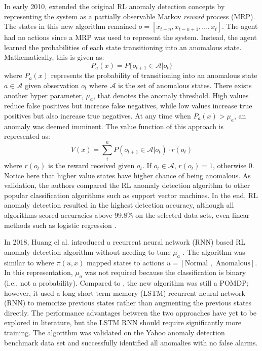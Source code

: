 In early 2010, \cite{seq_anomaly2} extended the original RL anomaly detection concepts by representing the system as a partially observable Markov \textit{reward} process (MRP). The states in this new algorithm remained $o = [x_{t-n}, x_{t-n+1}, ..., x_{t}]$. The agent had no actions since a MRP was used to represent the system. Instead, the agent learned the probabilities of each state transitioning into an anomalous state. Mathematically, this is given as:
\begin{equation}
    P_a(x) = P\{o_{t+1} \in \mathcal{A} | o_t\}
\end{equation}
where $P_a(x)$ represents the probability of transitioning into an anomalous state $a \in \mathcal{A}$ given observation $o_t$ where $\mathcal{A}$ is the set of anomalous states. There exists another hyper parameter, $\mu_a$, that denotes the anomaly threshold. High values reduce false positives but increase false negatives, while low values increase true positives but also increase true negatives. At any time when $P_a(x) > \mu_a$, an anomaly was deemed imminent. The value function of this approach is represented as:
\begin{equation}
    V(x) = \sum\limits_i^n P(o_{t+1} \in \mathcal{A} | o_t) \cdot r(o_t)
\end{equation}
where $r(o_t)$ is the reward received given $o_t$. If $o_t \in \mathcal{A}$, $r(o_t) = 1$, otherwise 0. Notice here that higher value states have higher chance of being anomalous. As validation, the authors compared the RL anomaly detection algorithm to other popular classification algorithms such as support vector machines. In the end, RL anomaly detection resulted in the highest detection accuracy, although all algorithms scored accuracies above 99.8\% on the selected data sets, even linear methods such as logistic regression \cite{seq_anomaly2}.
 
In 2018, Huang el al. introduced a recurrent neural network (RNN) based RL anomaly detection algorithm without needing to tune $\mu_a$ \cite{seq_anomaly3}. The algorithm was similar to \cite{seq_anomaly1} where $\pi(u, x)$ mapped states to actions $u = [\text{Normal }, \text{ Anomalous}]$.  In this representation, $\mu_a$ was not required because the classification is binary (i.e., not a probability). Compared to \cite{seq_anomaly1}, the new algorithm was still a POMDP; however, it used a long short term memory (LSTM) recurrent neural network (RNN) to memorize previous states rather than augmenting the previous states directly. The performance advantages between the two approaches have yet to be explored in literature, but the LSTM RNN should require significantly more training. The algorithm was validated on the Yahoo anomaly detection benchmark data set \cite{yahoo} and successfully identified all anomalies with no false alarms.














